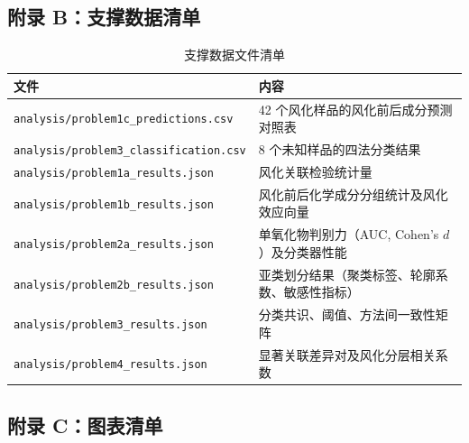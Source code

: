 \subsection*{附录 B：支撑数据清单}

\begin{table}[H]
    \centering
    \caption{支撑数据文件清单}
    \label{tab:data_files}
    \begin{tabular}{p{7cm} p{6cm}}
        \toprule
        \textbf{文件} & \textbf{内容} \\
        \midrule
        \texttt{analysis/problem1c\_predictions.csv} & 42 个风化样品的风化前后成分预测对照表 \\
        \texttt{analysis/problem3\_classification.csv} & 8 个未知样品的四法分类结果 \\
        \texttt{analysis/problem1a\_results.json} & 风化关联检验统计量 \\
        \texttt{analysis/problem1b\_results.json} & 风化前后化学成分分组统计及风化效应向量 \\
        \texttt{analysis/problem2a\_results.json} & 单氧化物判别力（AUC, Cohen's $d$）及分类器性能 \\
        \texttt{analysis/problem2b\_results.json} & 亚类划分结果（聚类标签、轮廓系数、敏感性指标） \\
        \texttt{analysis/problem3\_results.json} & 分类共识、阈值、方法间一致性矩阵 \\
        \texttt{analysis/problem4\_results.json} & 显著关联差异对及风化分层相关系数 \\
        \bottomrule
    \end{tabular}
\end{table}

\subsection*{附录 C：图表清单}

